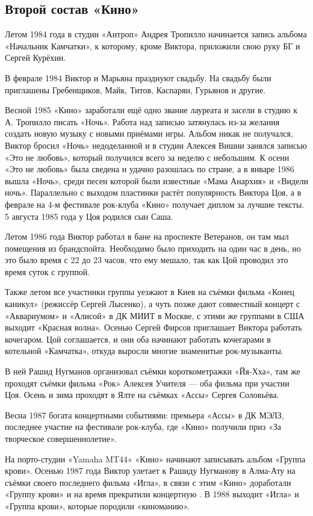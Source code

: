 \subsection{Второй состав «Кино»}
Летом 1984 года в студии «Антроп» Андрея Тропилло начинается запись альбома «Начальник Камчатки», к которому, кроме Виктора, приложили свою руку БГ и Сергей Курёхин.

В феврале 1984 Виктор и Марьяна празднуют свадьбу. На свадьбу были приглашены Гребенщиков, Майк, Титов, Каспарян, Гурьянов и другие.

Весной 1985 «Кино» заработали ещё одно звание лауреата и засели в студию к А. Тропилло писать «Ночь». Работа над записью затянулась из-за желания создать новую музыку с новыми приёмами игры. Альбом никак не получался, Виктор бросил «Ночь» недоделанной и в студии Алексея Вишни занялся записью «Это не любовь», который получился всего за неделю с небольшим. К осени «Это не любовь» была сведена и удачно разошлась по стране, а в январе 1986 вышла «Ночь», среди песен которой были известные «Мама Анархия» и «Видели ночь». Параллельно с выходом пластинки растёт популярность Виктора Цоя, а в феврале на 4-м фестивале рок-клуба «Кино» получает диплом за лучшие тексты. 5 августа 1985 года у Цоя родился сын Саша.


Летом 1986 года Виктор работал в бане на проспекте Ветеранов, он там мыл помещения из брандспойта. Необходимо было приходить на один час в день, но это было время с 22 до 23 часов, что ему мешало, так как Цой проводил это время суток с группой.

Также летом все участники группы уезжают в Киев на съёмки фильма «Конец каникул» (режиссёр Сергей Лысенко), а чуть позже дают совместный концерт с «Аквариумом» и «Алисой» в ДК МИИТ в Москве, с этими же группами в США выходит «Красная волна». Осенью Сергей Фирсов приглашает Виктора работать кочегаром. Цой соглашается, и они оба начинают работать кочегарами в котельной «Камчатка», откуда выросли многие знаменитые рок-музыканты.

В ней Рашид Нугманов организовал съёмки короткометражки «Йя-Хха», там же проходят съёмки фильма «Рок» Алексея Учителя --- оба фильма при участии Цоя. Осень и зима проходят в Ялте на съёмках «Ассы» Сергея Соловьёва.

Весна 1987 богата концертными событиями: премьера «Ассы» в ДК МЭЛЗ, последнее участие на фестивале рок-клуба, где «Кино» получили приз «За творческое совершеннолетие».

На порто-студии «Yamaha MT44» «Кино» начинают записывать альбом «Группа крови». Осенью 1987 года Виктор улетает к Рашиду Нугманову в Алма-Ату на съёмки своего последнего фильма «Игла», в связи с этим «Кино» доработали «Группу крови» и на время прекратили концертную . В 1988 выходит «Игла» и «Группа крови», которые породили «киноманию».


